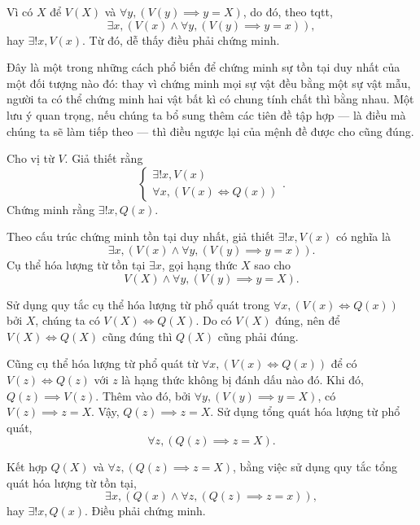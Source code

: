 Vì có $X$ để $V(X)$ và $\forall y, (V(y) \implies y = X)$, do đó, theo tqtt, \begin{equation*}
   \exists x, (V(x) \land \forall y, (V(y) \implies y = x)),
\end{equation*}
hay $\exists ! x, V(x)$. Từ đó, dễ thấy điều phải chứng minh.

Đây là một trong những cách phổ biến để chứng minh sự tồn tại duy nhất của một đối tượng nào đó: thay vì chứng minh mọi sự vật đều bằng một sự vật mẫu, người ta có thể chứng minh hai vật bất kì có chung tính chất thì bằng nhau. Một lưu ý quan trọng, nếu chúng ta bổ sung thêm các tiên đề tập hợp --- là điều mà chúng ta sẽ làm tiếp theo --- thì điều ngược lại của mệnh đề được cho cũng đúng. 

\exercise Cho vị từ $V$. Giả thiết rằng
\begin{equation*}
   \begin{cases}
      \exists ! x, V(x) \\
      \forall x, (V(x) \iff Q(x))
   \end{cases}.
\end{equation*}
Chứng minh rằng $\exists ! x, Q(x)$.

\solution

Theo cấu trúc chứng minh tồn tại duy nhất, giả thiết $\exists ! x, V(x)$ có nghĩa là
\begin{equation*}
   \exists x, \left(V(x) \land \forall y, (V(y) \implies y = x)\right).
\end{equation*}
Cụ thể hóa lượng từ tồn tại $\exists x$, gọi hạng thức $X$ sao cho
\begin{equation*}
   V(X) \land \forall y, (V(y) \implies y = X).
\end{equation*}

Sử dụng quy tắc cụ thể hóa lượng từ phổ quát trong $\forall x, (V(x) \iff Q(x))$ bởi $X$, chúng ta có $V(X) \iff Q(X)$. Do có $V(X)$ đúng, nên để $V(X) \iff Q(X)$ cũng đúng thì $Q(X)$ cũng phải đúng.

Cũng cụ thể hóa lượng từ phổ quát từ $\forall x, (V(x) \iff Q(x))$ để có $V(z) \iff Q(z)$ với $z$ là hạng thức không bị đánh dấu nào đó. Khi đó, $Q(z) \implies V(z)$. Thêm vào đó, bởi $\forall y, (V(y) \implies y = X)$, có $V(z) \implies z = X$. Vậy, $Q(z) \implies z = X$. Sử dụng tổng quát hóa lượng từ phổ quát,
\begin{equation*}
   \forall z, (Q(z) \implies z = X).
\end{equation*}

Kết hợp $Q(X)$ và $\forall z, (Q(z) \implies z = X)$, bằng việc sử dụng quy tắc tổng quát hóa lượng từ tồn tại, 
\begin{equation*}
   \exists x, \left(Q(x) \land \forall z, (Q(z) \implies z = x)\right),
\end{equation*}
hay $\exists ! x, Q(x)$. Điều phải chứng minh.

